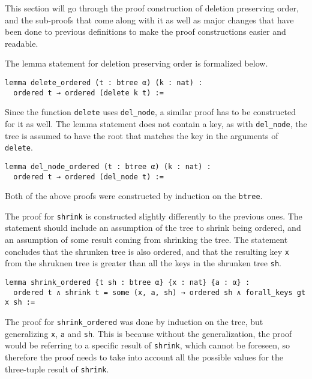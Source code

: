 This section will go through the proof construction of deletion preserving order, and the sub-proofs that come along with it as well as major changes that have been done to previous definitions to make the proof constructions easier and readable.

The lemma statement for deletion preserving order is formalized below.

\begin{lstlisting}[caption=\empty]
lemma delete_ordered (t : btree α) (k : nat) :
  ordered t → ordered (delete k t) :=
\end{lstlisting}

Since the function \lstinline{delete} uses \lstinline{del_node}, a similar proof has to be constructed for it as well. The lemma statement does not contain a key, as with \lstinline{del_node}, the tree is assumed to have the root that matches the key in the arguments of \lstinline{delete}.

\begin{lstlisting}[caption=\empty]
lemma del_node_ordered (t : btree α) (k : nat) :
  ordered t → ordered (del_node t) :=
\end{lstlisting}

Both of the above proofs were constructed by induction on the \lstinline{btree}.

The proof for \lstinline{shrink} is constructed slightly differently to the previous ones. The statement should include an assumption of the tree to shrink being ordered, and an assumption of some result coming from shrinking the tree. The statement concludes that the shrunken tree is also ordered, and that the resulting key \lstinline{x} from the shruknen tree is greater than all the keys in the shrunken tree \lstinline{sh}. 

\begin{lstlisting}[caption=\empty, label={lst:shrink_ordered}]
lemma shrink_ordered {t sh : btree α} {x : nat} {a : α} :
  ordered t ∧ shrink t = some (x, a, sh) → ordered sh ∧ forall_keys gt x sh :=
\end{lstlisting}

The proof for \lstinline{shrink_ordered} was done by induction on the tree, but generalizing \lstinline{x}, \lstinline{a} and \lstinline{sh}. This is because without the generalization, the proof would be referring to a specific result of \lstinline{shrink}, which cannot be foreseen, so therefore the proof needs to take into account all the possible values for the three-tuple result of \lstinline{shrink}.


